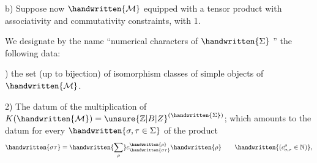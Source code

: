b) Suppose now $\handwritten{\mathcal{M}}$  equipped with a tensor product with associativity and commutativity constraints, with 1.

We designate by the name ``numerical characters of $\handwritten{\Sigma}$ '' the following data:

) the set (up to bijection) of  isomorphism classes of simple objects of $\handwritten{\mathcal{M}}$.

2) The datum of the multiplication of $K(\handwritten{\mathcal{M}})={\unsure{\mathbb{Z}|B|Z}}^{(\handwritten{\Sigma})}$; which amounts to the datum for every $\handwritten{\sigma,\tau\in\Sigma}$ of the product
\[
\handwritten{\sigma\tau}=\handwritten{\sum_\rho}c_{\handwritten{\sigma\tau}}^{\handwritten{\rho}}\handwritten{\rho}\qquad\handwritten{(c_{\sigma,\tau}^{\rho}\in\mathbb{N})},
\]
